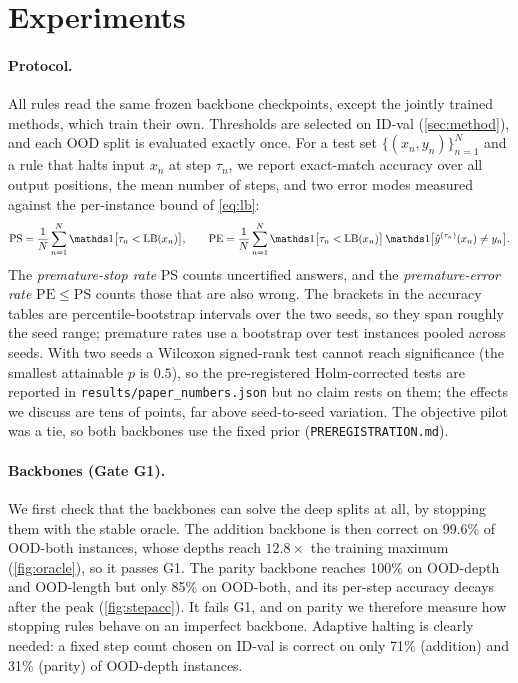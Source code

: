 \section{Experiments}
\label{sec:experiments}

\paragraph{Protocol.} All rules read the same frozen backbone checkpoints, except the jointly trained
methods, which train their own. Thresholds are selected on ID-val (\cref{sec:method}), and each OOD
split is evaluated exactly once. For a test set $\{(x_n,y_n)\}_{n=1}^N$ and a rule that halts input $x_n$
at step $\tau_n$, we report exact-match accuracy over all output positions, the mean number of steps,
and two error modes measured against the per-instance bound of \cref{eq:lb}:
\begin{equation}
  \mathrm{PS} = \frac1N\sum_{n=1}^N \ind\bigl[\tau_n < \LB(x_n)\bigr],
  \qquad
  \mathrm{PE} = \frac1N\sum_{n=1}^N \ind\bigl[\tau_n < \LB(x_n)\bigr]\,
  \ind\bigl[\yhat^{(\tau_n)}(x_n)\ne y_n\bigr].
  \label{eq:premature}
\end{equation}
The \emph{premature-stop rate} PS counts uncertified answers, and the \emph{premature-error rate}
$\mathrm{PE}\le\mathrm{PS}$ counts those that are also wrong. The brackets in the accuracy tables are
percentile-bootstrap intervals over the two seeds, so they span roughly the seed range; premature rates
use a bootstrap over test instances pooled across seeds. With two seeds a Wilcoxon signed-rank test
cannot reach significance (the smallest attainable $p$ is $0.5$), so the pre-registered Holm-corrected
tests are reported in \texttt{results/paper\_numbers.json} but no claim rests on them; the effects we
discuss are tens of points, far above seed-to-seed variation. The objective pilot was a tie, so both
backbones use the fixed prior (\texttt{PREREGISTRATION.md}).

\paragraph{Backbones (Gate G1).} We first check that the backbones can solve the deep splits at all, by
stopping them with the stable oracle. The addition backbone is then correct on 99.6\% of OOD-both
instances, whose depths reach $12.8\times$ the training maximum (\cref{fig:oracle}), so it passes G1. The
parity backbone reaches 100\% on OOD-depth and OOD-length but only 85\% on OOD-both, and its per-step
accuracy decays after the peak (\cref{fig:stepacc}). It fails G1, and on parity we therefore measure how
stopping rules behave on an imperfect backbone. Adaptive halting is clearly needed: a fixed step count
chosen on ID-val is correct on only 71\% (addition) and 31\% (parity) of OOD-depth instances.

